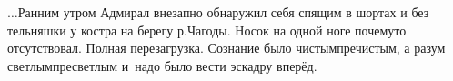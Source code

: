 





$\ldots$Ранним утром Адмирал внезапно обнаружил себя спящим в шортах и без тельняшки у костра на берегу р.Чагоды. Носок на одной ноге почему\sdash то отсутствовал. Полная перезагрузка. Сознание было чистым\sdash пречистым, а разум светлым\sdash пресветлым и~надо было вести эскадру вперёд.

\begin{center}
\end{center}
